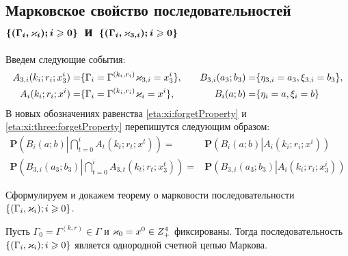 \documentclass[a4paper,12pt,russian]{extarticle}
\newcommand{\G}{\Gamma}
\newcommand{\Mark}{\{(\G_i, \vk_i); i \geqslant 0\}}
\newcommand{\MarkThree}{\{(\G_i, \vk_{3,i}); i \geqslant 0\}}
\newcommand{\ga}[1]{\Gamma^{\left( #1 \right)} }
\renewcommand{\Pr}{{\mathbf P}}
\begin{document}
\subsection[Марковское свойство последовательностей $\boldsymbol{\Mark}$ и $\boldsymbol{\MarkThree}$]%
{Марковское свойство последовательностей \\ $\boldsymbol{\Mark}$ и $\boldsymbol{\MarkThree}$}

Введем следующие события:
\begin{align*}
A_{3,i}(k_i;r_i;x_3^i) =& \{\G_i=\ga{k_i,r_i}\vk_{3,i}=x_3^i\}, \quad & B_{3,i}(a_3;b_3) =& \{\eta_{3,i}=a_3, \xi_{3,i}=b_3\},\\
A_i(k_i;r_i;x^i) =& \{\G_i=\ga{k_i,r_i}\vk_i=x^i\}, \quad & B_i(a;b) =& \{\eta_i=a, \xi_i=b\}
\end{align*}
В новых обозначениях равенства \eqref{eta:xi:forgetProperty} и \eqref{eta:xi:three:forgetProperty}  перепишутся следующим образом:
\begin{align}
\Pr \left(B_i(a;b) \left| \bigcap_{t=0}^{i} A_t(k_t;r_t;x^t)\right.\right) =& \Pr \left(B_i(a;b) \left|  A_i(k_i;r_i;x^i)\right.\right)
\label{new:notation:eta:xi:forget}\\
\Pr \left(B_{3,i}(a_3;b_3) \left| \bigcap_{t=0}^{i} A_{3,t}(k_t;r_t;x_3^t)\right.\right) =& \Pr \left(B_{3,i}(a_3;b_3) \left|  A_i(k_i;r_i;x_3^i)\right.\right)
\label{new:notation:eta:xi:three:forget}
\end{align}

Сформулируем и докажем теорему о марковости последовательности \linebreak$\Mark$.
\begin{theorem}
Пусть $\G_0=\ga{k,r}\in \G$ и $\varkappa_0=x^0\in Z_+^4$ фиксированы. Тогда последовательность $\Mark$ является однородной счетной цепью Маркова. 
\end{theorem}
\end{document}
